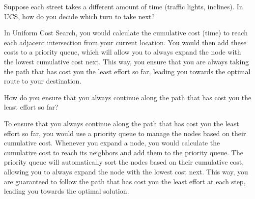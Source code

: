 \begin{ejercicio}[Approach]
    Suppose each street takes a different amount of time (traffic lights, inclines). In UCS, how do you decide which turn to take next?

    In Uniform Cost Search, you would calculate the cumulative cost (time) to reach each adjacent intersection from your current location. You would then add these costs to a priority queue, which will allow you to always expand the node with the lowest cumulative cost next. This way, you ensure that you are always taking the path that has cost you the least effort so far, leading you towards the optimal route to your destination.
\end{ejercicio}
\begin{ejercicio}
    How do you ensure that you always continue along the path that has cost you the least effort so far?

    To ensure that you always continue along the path that has cost you the least effort so far, you would use a priority queue to manage the nodes based on their cumulative cost. Whenever you expand a node, you would calculate the cumulative cost to reach its neighbors and add them to the priority queue. The priority queue will automatically sort the nodes based on their cumulative cost, allowing you to always expand the node with the lowest cost next. This way, you are guaranteed to follow the path that has cost you the least effort at each step, leading you towards the optimal solution.
\end{ejercicio}


